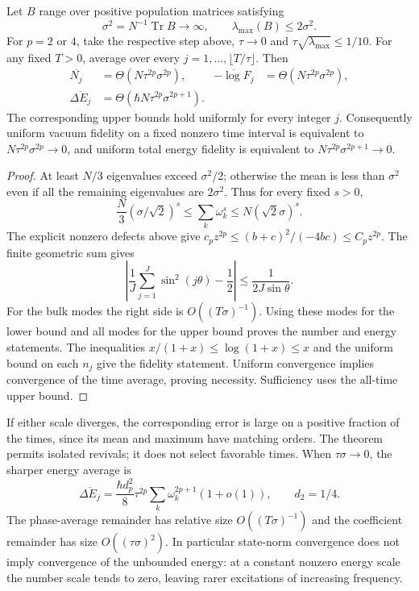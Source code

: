 \begin{theorem}
\label{thm:m1-global-vacuum-threshold}
Let $B$ range over positive population matrices satisfying
\[
 \sigma^2=N^{-1}\operatorname{Tr}B\longrightarrow\infty,
 \qquad \lambda_{\max}(B)\le2\sigma^2.
\]
For $p=2$ or $4$, take the respective
step above, $\tau\to0$ and $\tau\sqrt{\lambda_{\max}}\le1/10$.
For any fixed $T>0$, average over every $j=1,\ldots,\lfloor T/\tau\rfloor$.
Then
\begin{align*}
 \overline{N_j}&=\Theta(N\tau^{2p}\sigma^{2p}),&
 \overline{-\log F_j}&=\Theta(N\tau^{2p}\sigma^{2p}),\\
 \overline{\Delta E_j}&=\Theta(\hbar N\tau^{2p}\sigma^{2p+1}).
\end{align*}
The corresponding upper bounds hold uniformly for every integer $j$.
Consequently uniform vacuum fidelity on a fixed nonzero time interval is
equivalent to $N\tau^{2p}\sigma^{2p}\to0$, and uniform total energy
fidelity is equivalent to $N\tau^{2p}\sigma^{2p+1}\to0$.
\end{theorem}
\begin{proof}
At least $N/3$ eigenvalues exceed $\sigma^2/2$; otherwise the mean is
less than $\sigma^2$ even if all the remaining eigenvalues are $2\sigma^2$.
Thus for every fixed $s>0$,
\[
 \frac N3(\sigma/\sqrt2)^s\le\sum_k\omega_k^s
                         \le N(\sqrt2\sigma)^s.
\]
The explicit nonzero defects above give
$c_pz^{2p}\le(b+c)^2/(-4bc)\le C_pz^{2p}$. The finite geometric sum gives
\[
 \left|\frac1J\sum_{j=1}^J\sin^2(j\theta)-\frac12\right|
 \le\frac{1}{2J\sin\theta}.
\]
For the bulk modes the right side is $O((T\sigma)^{-1})$. Using these
modes for the lower bound and all modes for the upper bound proves the
number and energy statements. The inequalities
$x/(1+x)\le\log(1+x)\le x$ and the uniform bound on each $n_j$ give
the fidelity statement. Uniform convergence implies convergence of the
time average, proving necessity. Sufficiency uses the all-time upper bound.
\end{proof}

If either scale diverges, the corresponding error is large on a positive
fraction of the times, since its mean and maximum have matching orders.
The theorem permits isolated revivals; it does not select favorable times.
When $\tau\sigma\to0$, the sharper energy average is
\[
 \overline{\Delta E_j}
 =\frac{\hbar d_p^2}{8}\tau^{2p}\sum_k\omega_k^{2p+1}(1+o(1)),
 \qquad d_2=1/4.
\]
The phase-average remainder has relative size $O((T\sigma)^{-1})$ and
the coefficient remainder has size $O((\tau\sigma)^2)$. In particular
state-norm convergence does not imply convergence of the unbounded energy:
at a constant nonzero energy scale the number scale tends to zero, leaving
rarer excitations of increasing frequency.

